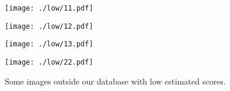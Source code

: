 \documentclass[runningheads]{llncs}
\begin{document}
\begin{figure*}[!htb]
    \begin{minipage}{0.5\textwidth}
        \centering
        \texttt{[image: ./low/11.pdf]}
\end{minipage}\begin{minipage}{0.5\textwidth}
        \centering
        \texttt{[image: ./low/12.pdf]}
\end{minipage}

    \begin{minipage}{0.5\textwidth}
        \centering
        \texttt{[image: ./low/13.pdf]}
\end{minipage}\begin{minipage}{0.5\textwidth}
        \centering
        \texttt{[image: ./low/22.pdf]}
\end{minipage}
    \vspace{10mm}

    \caption{Some images outside our database with low estimated scores.}
    \label{fig:lowImages}
\end{figure*}
\end{document}
